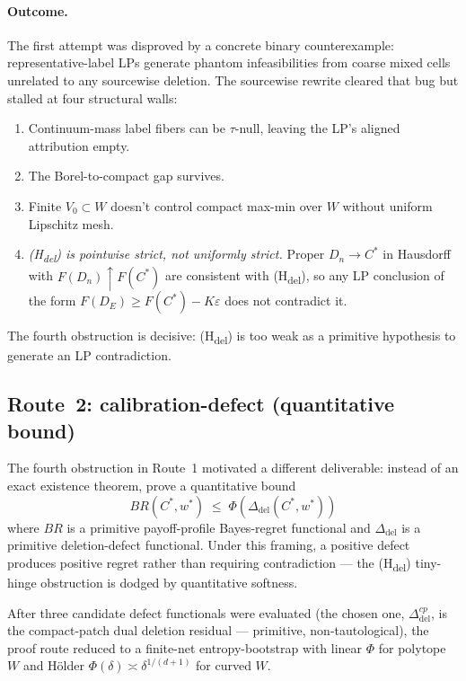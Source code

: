 \documentclass[11pt]{article}
\theoremstyle{definition}
\theoremstyle{remark}
\newcommand{\eps}{\varepsilon}
\begin{document}
\paragraph{Outcome.} The first attempt was disproved by a concrete
binary counterexample: representative-label LPs generate phantom
infeasibilities from coarse mixed cells unrelated to any sourcewise
deletion. The sourcewise rewrite cleared that bug but stalled at
four structural walls:
\begin{enumerate}[leftmargin=2em]
\item Continuum-mass label fibers can be $\tau$-null, leaving the
LP's aligned attribution empty.
\item The Borel-to-compact gap survives.
\item Finite $V_0 \subset W$ doesn't control compact max-min over $W$
without uniform Lipschitz mesh.
\item \emph{(H\textsubscript{del}) is pointwise strict, not
uniformly strict.} Proper $D_n \to C^*$ in Hausdorff with
$F(D_n) \uparrow F(C^*)$ are consistent with (H\textsubscript{del}),
so any LP conclusion of the form $F(D_E) \ge F(C^*) - K\eps$ does
not contradict it.
\end{enumerate}

The fourth obstruction is decisive: (H\textsubscript{del}) is too
weak as a primitive hypothesis to generate an LP contradiction.

\subsection{Route~2: calibration-defect (quantitative bound)}\label{sec:route2}

The fourth obstruction in Route~1 motivated a different deliverable:
instead of an exact existence theorem, prove a quantitative bound
\[
  BR(C^*, w^*) \;\le\; \Phi(\Delta_\text{del}(C^*, w^*))
\]
where $BR$ is a primitive payoff-profile Bayes-regret functional and
$\Delta_\text{del}$ is a primitive deletion-defect functional. Under
this framing, a positive defect produces positive regret rather than
requiring contradiction --- the (H\textsubscript{del}) tiny-hinge
obstruction is dodged by quantitative softness.

After three candidate defect functionals were evaluated (the chosen
one, $\Delta_\text{del}^{cp}$, is the compact-patch dual deletion
residual --- primitive, non-tautological), the proof route reduced
to a finite-net entropy-bootstrap with linear $\Phi$ for polytope
$W$ and Hölder $\Phi(\delta) \asymp \delta^{1/(d+1)}$ for curved $W$.
\end{document}

